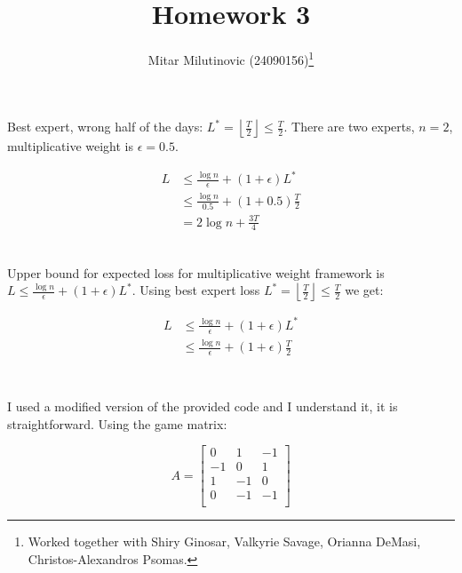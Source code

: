 \documentclass[a4paper,11pt,oneside,onecolumn]{article}
\title{Homework 3}
\author{Mitar Milutinovic (24090156)\thanks{Worked together with Shiry Ginosar, Valkyrie Savage, Orianna DeMasi, Christos-Alexandros Psomas.}}
\begin{document}
\maketitle

\section{}

\subsection{}

Best expert, wrong half of the days: $L^* = \left\lfloor \frac{T}{2} \right\rfloor \le \frac{T}{2}$.
There are two experts, $n=2$, multiplicative weight is $\epsilon=0.5$.

\begin{align*}
L & \le \frac{\log n}{\epsilon} + (1 + \epsilon) L^* \\
 & \le \frac{\log n}{0.5} + (1 + 0.5) \frac{T}{2} \\
 & = 2\log n + \frac{3T}{4} \\
\end{align*}

\subsection{}

Upper bound for expected loss for multiplicative weight framework is $L \le \frac{\log n}{\epsilon} + (1 + \epsilon) L^*$.
Using best expert loss $L^* = \left\lfloor \frac{T}{2} \right\rfloor \le \frac{T}{2}$ we get:

\begin{align*}
L & \le \frac{\log n}{\epsilon} + (1 + \epsilon) L^* \\
 & \le \frac{\log n}{\epsilon} + (1 + \epsilon) \frac{T}{2} \\
\end{align*}

\section{}

I used a modified version of the provided code and I understand it, it is straightforward. Using the game matrix:

$$
A = \left[\begin{array}{ccc}
0 & 1 & -1 \\
-1 & 0 & 1 \\
1 & -1 & 0 \\
0 & -1 & -1 \\
\end{array}\right]
$$
\end{document}
